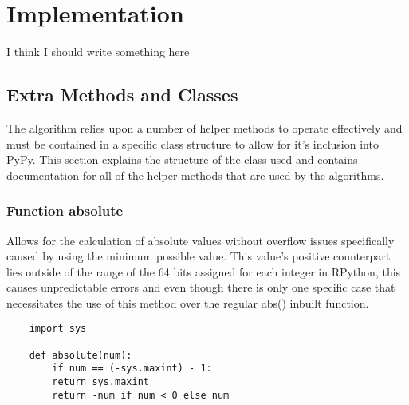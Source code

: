 \documentclass[12pt]{article}
\begin{document}
\section{Implementation}
{\color{red} I think I should write something here}
\subsection{Extra Methods and Classes}
The algorithm relies upon a number of helper methods to operate effectively and must be contained in a specific class structure to allow for it's inclusion into PyPy. This section explains the structure of the class used and contains documentation for all of the helper methods that are used by the algorithms.

\subsubsection{Function absolute}
Allows for the calculation of absolute values without overflow issues specifically caused by using the minimum possible value. This value's positive counterpart lies outside of the range of the 64 bits assigned for each integer in RPython, this causes unpredictable errors and even though there is only one specific case that necessitates the use of this method over the regular abs() inbuilt function.
\begin{lstlisting}
	import sys
        
	def absolute(num):
        if num == (-sys.maxint) - 1:
        return sys.maxint
        return -num if num < 0 else num
\end{lstlisting}
\pagebreak
\end{document}
